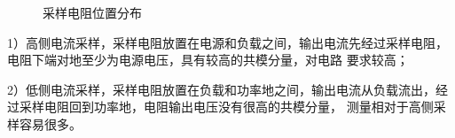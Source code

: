 \documentclass[UTF8]{ctexart}
\numberwithin{equation}{section} %
\numberwithin{figure}{section}
\begin{document}
    \begin{figure}[htb]
        \centering
        \caption{采样电阻位置分布}
        \label{f2.2}
    \end{figure}

    1）高侧电流采样，采样电阻放置在电源和负载之间，输出电流先经过采样电阻，电阻下端对地至少为电源电压，具有较高的共模分量，对电路
    要求较高；

    2）低侧电流采样，采样电阻放置在负载和功率地之间，输出电流从负载流出，经过采样电阻回到功率地，电阻输出电压没有很高的共模分量，
    测量相对于高侧采样容易很多。
\end{document}
